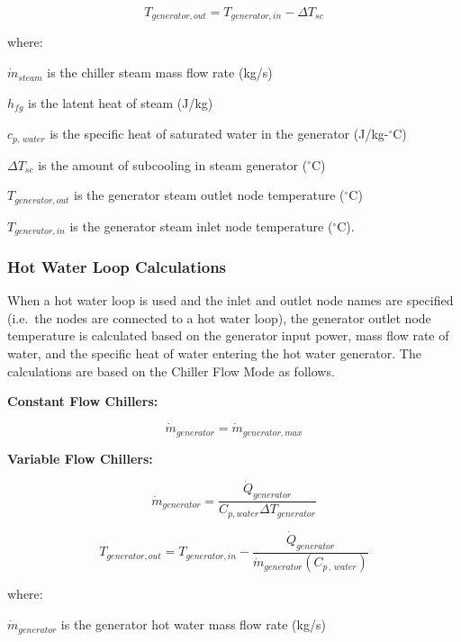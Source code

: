 \begin{equation}
{T_{generator,out}} = {T_{generator,in}} - \Delta {T_{sc}}
\end{equation}

where:

\({\dot m_{steam}}\) is the chiller steam mass flow rate (kg/s)

\({h_{fg}}\) is the latent heat of steam (J/kg)

\({c_{p,\,water}}\) is the specific heat of saturated water in the generator (J/kg-\(^{\circ}\)C)

\(\Delta {T_{sc}}\) is the amount of subcooling in steam generator (\(^{\circ}\)C)

\({T_{generator,out}}\) is the generator steam outlet node temperature (\(^{\circ}\)C)

\({T_{generator,in}}\) is the generator steam inlet node temperature (\(^{\circ}\)C).

\subsubsection{Hot Water Loop Calculations}\label{hot-water-loop-calculations}

When a hot water loop is used and the inlet and outlet node names are specified (i.e.~the nodes are connected to a hot water loop), the generator outlet node temperature is calculated based on the generator input power, mass flow rate of water, and the specific heat of water entering the hot water generator. The calculations are based on the Chiller Flow Mode as follows.

\textbf{Constant Flow Chillers:}

\begin{equation}
{\dot m_{generator}} = {\dot m_{generator,max}}
\end{equation}

\textbf{Variable Flow Chillers:}

\begin{equation}
  \dot{m}_{generator} = \frac{\dot{Q}_{generator}}{C_{p,water}\Delta T_{generator}}
\end{equation}

\begin{equation}
{T_{generator,out}} = {T_{generator,in}} - \frac{{{{\dot Q}_{generator}}}}{{{{\dot m}_{generator}}\left( {{C_{p\,,\,water}}} \right)}}
\end{equation}

where:

\({\dot m_{generator}}\) is the generator hot water mass flow rate (kg/s)

